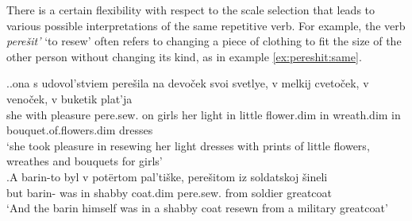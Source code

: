 %
%
%

There is a certain flexibility with respect to the scale selection that leads to various possible interpretations of the same repetitive verb. For example, the verb \textit{pere\v{s}it'} `to resew' often refers to changing a piece of clothing to fit the size of the other person without changing its kind, as in example \ref{ex:pereshit:same}.

\ex.\label{ex:pereshit}\ag.\label{ex:pereshit:same}ona s udovol'stviem pere\v{s}ila na devo\v{c}ek svoi svetlye, v melkij cveto\v{c}ek, v veno\v{c}ek, v buketik plat'ja\\
she with pleasure pere.sew. on girls her light in little flower.dim in wreath.dim in bouquet.of.flowers.dim dresses\\
\trans `she took pleasure in resewing her light dresses with prints of little flowers, wreathes and bouquets for girls'\\
\bg.\label{ex:pereshit:other}A barin-to byl v pot\"{e}rtom pal'ti\v{s}ke, pere\v{s}itom iz soldatskoj \v{s}ineli\\
but barin- was in shabby coat.dim pere.sew. from soldier greatcoat\\
\trans `And the barin himself was in a shabby coat resewn from a military greatcoat'

